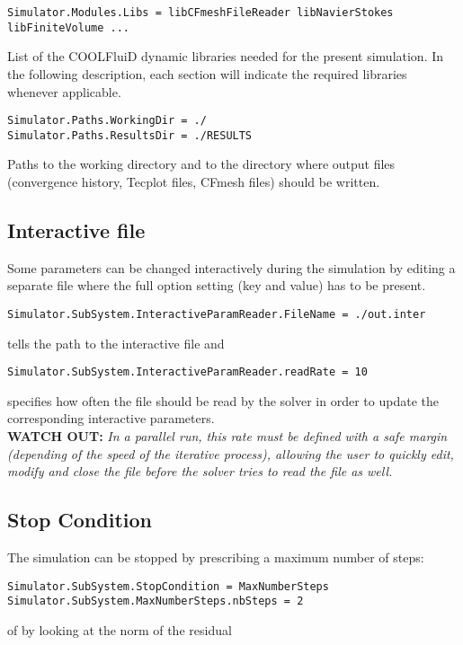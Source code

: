 \documentclass[11pt]{article}
\begin{document}
\begin{verbatim}
Simulator.Modules.Libs = libCFmeshFileReader libNavierStokes libFiniteVolume ...
\end{verbatim}
List of the COOLFluiD dynamic libraries needed for the present simulation. In the following description, each section will indicate the required libraries whenever applicable.

\begin{verbatim}
Simulator.Paths.WorkingDir = ./
Simulator.Paths.ResultsDir = ./RESULTS
\end{verbatim}
Paths to the working directory and to the directory where output files (convergence history, Tecplot files, CFmesh files) should be written. 

\subsection{Interactive file}

Some parameters can be changed interactively during the simulation by editing a separate file
where the full option setting (key and value) has to be present.

\begin{verbatim}
Simulator.SubSystem.InteractiveParamReader.FileName = ./out.inter
\end{verbatim}
tells the path to the interactive file and
\begin{verbatim}
Simulator.SubSystem.InteractiveParamReader.readRate = 10
\end{verbatim}
specifies how often the file should be read by the solver in order to update the corresponding interactive parameters.\\
{\bf WATCH OUT:}  {\it In a parallel run, this rate must be defined with a safe margin (depending of the speed of the iterative process), 
  allowing the user to quickly edit, modify and close the file before the solver tries to read the file as well.}

\subsection{Stop Condition}

The simulation can be stopped by prescribing a maximum number of steps:

\begin{verbatim}
Simulator.SubSystem.StopCondition = MaxNumberSteps
Simulator.SubSystem.MaxNumberSteps.nbSteps = 2
\end{verbatim}
of by looking at the norm of the residual
\end{document}
